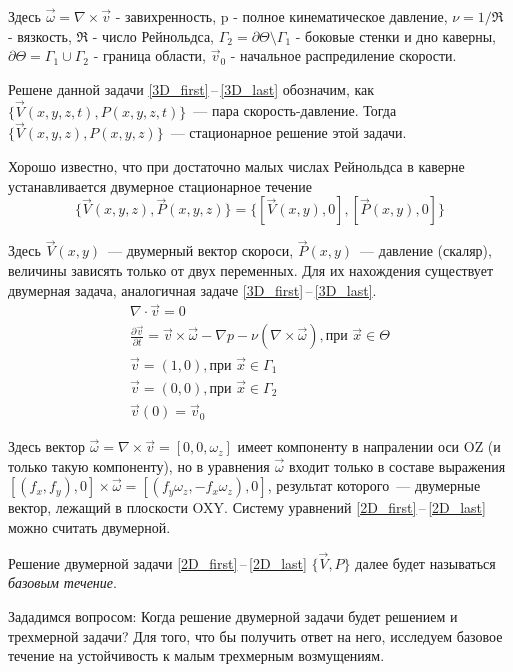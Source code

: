 Здесь $ \vec \omega = \nabla \times \vec v $ - завихренность, p - полное кинематическое давление,
$ \nu = 1 / \Re $ - вязкость, $ \Re $ - число Рейнольдса, $ \Gamma_2 = \partial \Theta \setminus \Gamma_1 $ - боковые стенки и дно каверны, $ \partial \Theta = \Gamma_1 \cup \Gamma_2 $ - 
граница области, $\vec v _0$ - начальное распредиление скорости. 

Решене данной задачи \ref{3D_first}\,--\,\ref{3D_last} обозначим, как $ \{ \vec V(x,y,z,t), P(x,y,z,t) \} $~--- пара скорость-давление. Тогда $ \{ \vec V(x,y,z), P(x,y,z) \} $~--- стационарное решение этой задачи. 

Хорошо известно, что при достаточно малых числах Рейнольдса в каверне устанавливается двумерное стационарное течение $$ 
  \{\vec V(x,y,z), \vec P(x,y,z) \} = \{[\vec V(x,y), 0], [\vec P(x,y), 0]\}
$$

Здесь $\vec V(x,y)$~--- двумерный вектор скороси, $ \vec P(x,y) $~--- давление (скаляр), величины зависять только от двух переменных. Для их нахождения существует двумерная задача, аналогичная задаче \ref{3D_first}\,--\,\ref{3D_last}.
\begin{gather}
  \label{2D_first}
  \nabla \cdot \vec v = 0 \\
  \frac{\partial \vec v}{\partial t} = \vec v \times \vec \omega - \nabla p - 
  \nu ( \nabla \times \vec \omega ), \text{при } \vec x \in \Theta \\
  \vec v = (1,0), \text{при } \vec x \in \Gamma_1\\
  \vec v = (0,0), \text{при } \vec x \in \Gamma_2\\
  \vec v (0) = \vec v _0
  \label{2D_last}
\end{gather}

Здесь вектор $ \vec \omega = \nabla \times \vec v = [0,0,\omega_z]$ имеет компоненту в напралении оси OZ (и только такую компоненту), но в уравнения $ \vec \omega $ входит только в составе выражения $ [(f_x,f_y),0] \times \vec \omega = [(f_y \omega_z, -f_x \omega_z), 0]$, результат которого~--- двумерные вектор, лежащий в плоскости OXY. Систему уравнений \ref{2D_first}\,--\,\ref{2D_last} можно считать двумерной. 

Решение двумерной задачи \ref{2D_first}\,--\,\ref{2D_last} $\{ \vec V, P \}$ далее будет называться \textit{базовым течение}.

Зададимся вопросом: Когда решение двумерной задачи будет решением и трехмерной задачи? Для того, что бы получить ответ на него, исследуем базовое течение на устойчивость к малым трехмерным возмущениям. 


